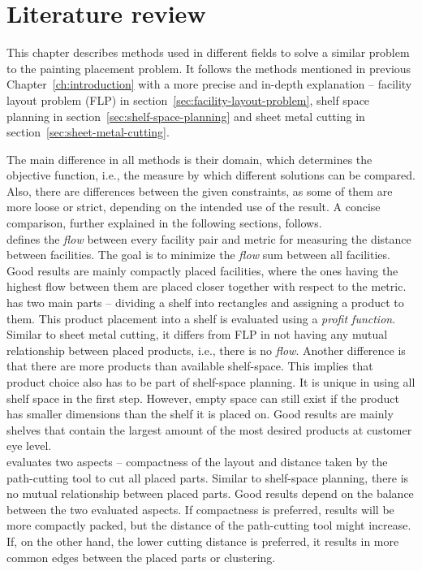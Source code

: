 \chapter{Literature review}\label{ch:literature-review}

This chapter describes methods used in different fields to solve a similar problem to the painting placement problem.
It follows the methods mentioned in previous Chapter~\ref{ch:introduction} with
a more precise and in-depth explanation – facility layout problem (FLP) in section~\ref{sec:facility-layout-problem},
shelf space planning in section~\ref{sec:shelf-space-planning} and sheet metal cutting in section~\ref{sec:sheet-metal-cutting}.

The main difference in all methods is their domain, which determines the objective function, i.e.,
the measure by which different solutions can be compared.
Also, there are differences between the given constraints, as some of them are more loose or strict,
depending on the intended use of the result.
A concise comparison, further explained in the following sections, follows.\\

 defines the \textit{flow} between every facility pair and metric for measuring the distance between facilities.
The goal is to minimize the \textit{flow} sum between all facilities.
Good results are mainly compactly placed facilities, where the ones having the
highest flow between them are placed closer together with respect to the metric.\\

 has two main parts – dividing a shelf into rectangles and assigning a product to them.
This product placement into a shelf is evaluated using a \textit{profit function}. Similar to sheet metal cutting, it differs from FLP
in not having any mutual relationship between placed products, i.e., there is no \textit{flow}.
Another difference is that there are more products than available shelf-space.
This implies that product choice also has to be part of shelf-space planning.
It is unique in using all shelf space in the first step.
However, empty space can still exist if the product has smaller dimensions than the shelf it is placed on.
Good results are mainly shelves that contain the largest amount of the most desired products at customer eye level.\\

 evaluates two aspects – compactness of the layout and distance taken by the path-cutting tool to cut all placed parts.
Similar to shelf-space planning, there is no mutual relationship between placed parts.
Good results depend on the balance between the two evaluated aspects. If compactness is
preferred, results will be more compactly packed, but the distance of the path-cutting tool might increase.
If, on the other hand, the lower cutting distance is preferred, it results in more common edges between the placed parts or clustering.\\







